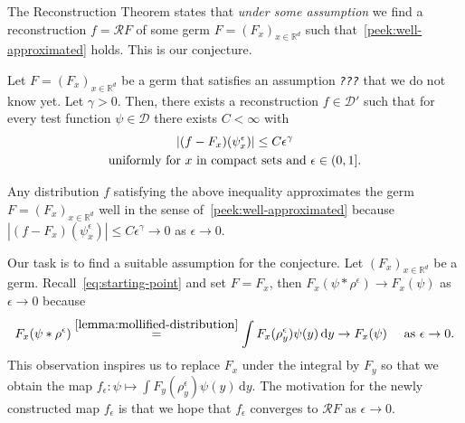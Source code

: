 The Reconstruction Theorem states that \emph{under some assumption} we find a reconstruction \(  f = \mathcal{R}F \) of some germ \( F = (F_x)_{x \in \mathbb{R}^d} \) such that~\eqref{peek:well-approximated} holds. This is our conjecture.

\begin{conjecture}\label{peek:conjecture}
    Let \({F = (F_x)}_{x \in \mathbb{R}^d}\) be a germ that satisfies an assumption \emph{\texttt{???}} that we do not know yet. Let \( \gamma > 0 \). Then, there exists a reconstruction \(f \in \mathcal{D}'\) such that for every test function \(\psi \in \mathcal{D}\) there exists \(C < {\infty}\) with
    \begin{gather}\label{peek:eq:conjecture}
        |(f-F_x)(\psi^\epsilon_x)| \leq C \epsilon^{\gamma} \\
        \text{uniformly for \(x\) in compact sets and \( \epsilon \in (0,1] \)} \nonumber. %
    \end{gather}
    
\end{conjecture}

Any distribution \(f\) satisfying the above inequality approximates the germ \( F = (F_x)_{x \in \mathbb{R}^d} \) well in the sense of~\eqref{peek:well-approximated} because \(|(f-F_x)(\psi^\epsilon_x)| \leq C  \epsilon^{\gamma} \to 0\) as \(\epsilon \to 0\).

Our task is to find a suitable assumption for the conjecture. Let \({(F_x)}_{x \in \mathbb{R}^d}\) be a germ. Recall~\eqref{eq:starting-point} and set \( F = F_x \), then \( F_x(\psi * \rho^\epsilon) \to F_x(\psi) \) as \( \epsilon \to 0 \) because
\begin{align*}
    F_x(\psi * \rho^\epsilon) \overset{\eqref{lemma:mollified-distribution}}{=} \int F_x(\rho_y^\epsilon) \psi(y)\, \mathrm{d}y \to F_x(\psi) \quad \text{ as } \epsilon \to 0.
\end{align*}
This observation inspires us to replace \(F_x\) under the integral by \(F_y\) so that we obtain the map \(f_\epsilon: \psi \mapsto \int F_y(\rho_y^\epsilon) \psi(y)\, \mathrm{d}y\). The motivation for the newly constructed map \(f_{\epsilon}\) is that we hope that \( f_\epsilon \) converges to \( \mathcal{R}F \) as \( \epsilon \to 0 \).

